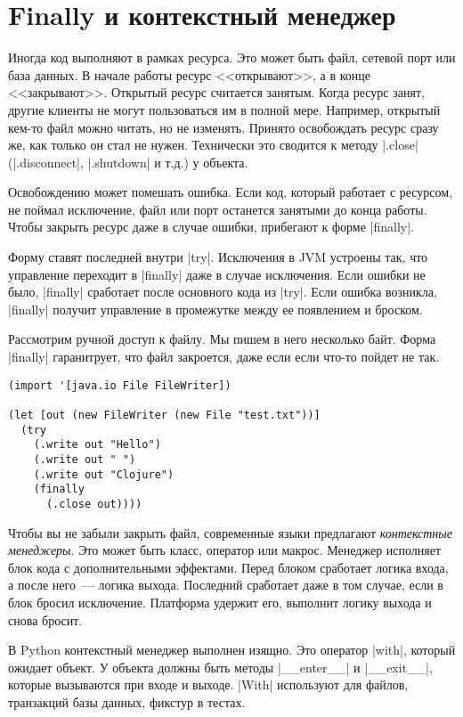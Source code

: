 \section{Finally и контекстный менеджер}

Иногда код выполняют в рамках ресурса. Это может быть файл, сетевой порт или
база данных. В начале работы ресурс <<открывают>>, а в конце
<<закрывают>>. Открытый ресурс считается занятым. Когда ресурс занят, другие
клиенты не могут пользоваться им в полной мере. Например, открытый кем-то файл
можно читать, но не изменять. Принято освобождать ресурс сразу же, как только он
стал не нужен. Технически это сводится к методу \spverb|.close|
(\spverb|.disconnect|, \spverb|.shutdown| и т.д.) у объекта.

Освобождению может помешать ошибка. Если код, который работает с ресурсом, не
поймал исключение, файл или порт останется занятыми до конца работы. Чтобы
закрыть ресурс даже в случае ошибки, прибегают к форме \spverb|finally|.

Форму ставят последней внутри \spverb|try|. Исключения в JVM устроены так, что
управление переходит в \spverb|finally| даже в случае исключения. Если ошибки не
было, \spverb|finally| сработает после основного кода из \spverb|try|. Если
ошибка возникла, \spverb|finally| получит управление в промежутке между ее
появлением и броском.

Рассмотрим ручной доступ к файлу. Мы пишем в него несколько байт. Форма
\spverb|finally| гаранитрует, что файл закроется, даже если если что-то пойдет
не так.

\begin{verbatim}
(import '[java.io File FileWriter])

(let [out (new FileWriter (new File "test.txt"))]
  (try
    (.write out "Hello")
    (.write out " ")
    (.write out "Clojure")
    (finally
      (.close out))))
\end{verbatim}

Чтобы вы не забыли закрыть файл, современные языки предлагают \emph{контекстные
  менеджеры}. Это может быть класс, оператор или макрос. Менеджер исполняет блок
кода с дополнительными эффектами. Перед блоком сработает логика входа, а после
него~--- логика выхода. Последний сработает даже в том случае, если в блок
бросил исключение. Платформа удержит его, выполнит логику выхода и снова бросит.

В Python контекстный менеджер выполнен изящно. Это оператор \spverb|with|,
который ожидает объект. У объекта должны быть методы \spverb|__enter__| и
\spverb|__exit__|, которые вызываются при входе и выходе. \spverb|With|
используют для файлов, транзакций базы данных, фикстур в тестах.

